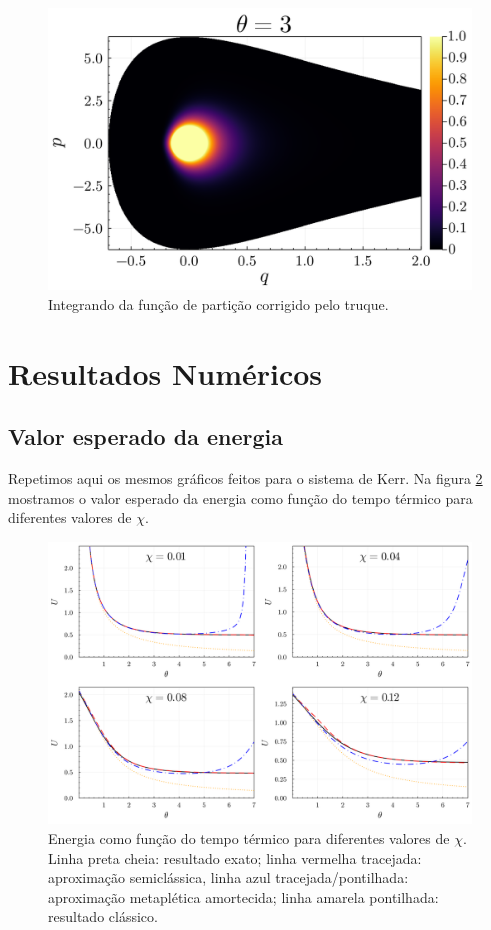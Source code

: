 \documentclass[
	12pt,
	oneside,			%
	a4paper,			%
	english,			%
	brazil				%
	]{abntex2}
\theoremstyle{definition}
\begin{document}
\begin{figure}[H]
    \includegraphics[width=.6\textwidth]{Imagens/det_part_3.png}
    \centering
    \caption{Integrando da função de partição corrigido pelo truque.}
    \label{det part 3}
\end{figure}

\section{Resultados Numéricos}

\subsection{Valor esperado da energia}

Repetimos aqui os mesmos gráficos feitos para o sistema de Kerr. Na figura \ref{energias morse} mostramos o valor esperado da energia como função do tempo térmico para diferentes valores de $\chi$.

\begin{figure}[H]
    \includegraphics[width=.9\textwidth]{Imagens/energias_morse.png}
    \centering
    \caption{Energia como função do tempo térmico para diferentes valores de $\chi$. Linha preta cheia: resultado exato; linha vermelha tracejada: aproximação semiclássica, linha azul tracejada/pontilhada: aproximação metaplética amortecida; linha amarela pontilhada: resultado clássico.}
    \label{energias morse}
\end{figure}
\end{document}
